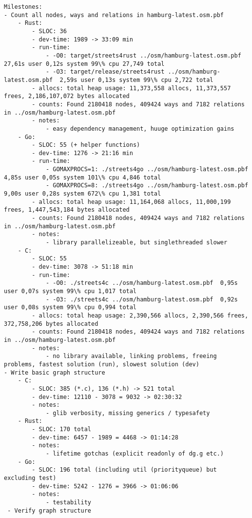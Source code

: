\begin{verbatim}
Milestones:
- Count all nodes, ways and relations in hamburg-latest.osm.pbf
    - Rust:
        - SLOC: 36
        - dev-time: 1989 -> 33:09 min
        - run-time:
            - -O0: target/streets4rust ../osm/hamburg-latest.osm.pbf  27,61s user 0,12s system 99\% cpu 27,749 total
            - -O3: target/release/streets4rust ../osm/hamburg-latest.osm.pbf  2,59s user 0,13s system 99\% cpu 2,722 total
        - allocs: total heap usage: 11,373,558 allocs, 11,373,557 frees, 2,186,107,072 bytes allocated
        - counts: Found 2180418 nodes, 409424 ways and 7182 relations in ../osm/hamburg-latest.osm.pbf
        - notes:
            - easy dependency management, huuge optimization gains
    - Go:
        - SLOC: 55 (+ helper functions)
        - dev-time: 1276 -> 21:16 min
        - run-time:
            - GOMAXPROCS=1: ./streets4go ../osm/hamburg-latest.osm.pbf  4,85s user 0,05s system 101\% cpu 4,846 total
            - GOMAXPROCS=8: ./streets4go ../osm/hamburg-latest.osm.pbf  9,00s user 0,28s system 672\% cpu 1,381 total
        - allocs: total heap usage: 11,164,068 allocs, 11,000,199 frees, 1,447,543,184 bytes allocated
        - counts: Found 2180418 nodes, 409424 ways and 7182 relations in ../osm/hamburg-latest.osm.pbf
        - notes:
            - library parallelizeable, but singlethreaded slower
    - C:
        - SLOC: 55
        - dev-time: 3078 -> 51:18 min
        - run-time:
            - -O0: ./streets4c ../osm/hamburg-latest.osm.pbf  0,95s user 0,07s system 99\% cpu 1,017 total
            - -O3: ./streets4c ../osm/hamburg-latest.osm.pbf  0,92s user 0,08s system 99\% cpu 0,994 total
        - allocs: total heap usage: 2,390,566 allocs, 2,390,566 frees, 372,758,206 bytes allocated
        - counts: Found 2180418 nodes, 409424 ways and 7182 relations in ../osm/hamburg-latest.osm.pbf
        - notes:
            - no library available, linking problems, freeing problems, fastest solution (run), slowest solution (dev)
- Write basic graph structure
    - C:
        - SLOC: 385 (*.c), 136 (*.h) -> 521 total
        - dev-time: 12110 - 3078 = 9032 -> 02:30:32
        - notes:
            - glib verbosity, missing generics / typesafety
    - Rust:
        - SLOC: 170 total
        - dev-time: 6457 - 1989 = 4468 -> 01:14:28
        - notes:
            - lifetime gotchas (explicit readonly of dg.g etc.)
    - Go:
        - SLOC: 196 total (including util (priorityqueue) but excluding test)
        - dev-time: 5242 - 1276 = 3966 -> 01:06:06
        - notes:
            - testability
 - Verify graph structure

\end{verbatim}
